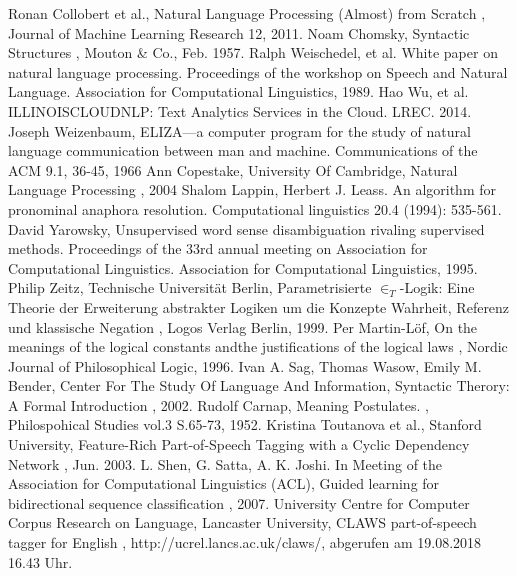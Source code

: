 \documentclass[12pt]{report}
\begin{document}
\newpage
\begin{thebibliography}{20}
Ronan Collobert et al., \glqq  Natural Language Processing (Almost) from Scratch\grqq{} , Journal of Machine Learning Research 12, 2011. 
 Noam Chomsky, \glqq  Syntactic Structures\grqq{} , Mouton \& Co., Feb. 1957.
Ralph Weischedel, et al. \glqq  White paper on natural language processing.\grqq{}  Proceedings of the workshop on Speech and Natural Language. Association for Computational Linguistics, 1989.
Hao Wu, et al. \glqq  ILLINOISCLOUDNLP: Text Analytics Services in the Cloud.\grqq{}  LREC. 2014.
Joseph Weizenbaum, \glqq  ELIZA—a computer program for the study of natural language communication between man and machine.\grqq{}  Communications of the ACM 9.1, 36-45, 1966
Ann Copestake, University Of Cambridge, \glqq  Natural Language Processing\grqq{} , 2004
 Shalom Lappin, Herbert J. Leass. \glqq  An algorithm for pronominal anaphora resolution.\grqq{}  Computational linguistics 20.4 (1994): 535-561.
David Yarowsky, \glqq  Unsupervised word sense disambiguation rivaling supervised methods.\grqq{}  Proceedings of the 33rd annual meeting on Association for Computational Linguistics. Association for Computational Linguistics, 1995.
Philip Zeitz, Technische Universität Berlin, \glqq  Parametrisierte $\in_T$-Logik: Eine Theorie der Erweiterung abstrakter Logiken um die Konzepte Wahrheit, Referenz und klassische Negation\grqq{} , Logos Verlag Berlin, 1999.
Per Martin-Löf, \glqq  On the meanings of the logical constants andthe justifications of the logical laws\grqq{} , Nordic Journal of Philosophical Logic, 1996.
Ivan A. Sag, Thomas Wasow, Emily M. Bender, Center For The Study Of Language And Information, \glqq  Syntactic Therory: A Formal Introduction\grqq{} , 2002.
Rudolf Carnap, \glqq  Meaning Postulates.\grqq{} , Philospohical Studies vol.3 S.65-73, 1952.
Kristina Toutanova et al., Stanford University, \glqq  Feature-Rich Part-of-Speech Tagging with a Cyclic Dependency Network\grqq{} , Jun. 2003.
 L. Shen, G. Satta, A. K. Joshi. In Meeting of the Association for Computational Linguistics (ACL), \glqq  Guided learning for bidirectional sequence classification\grqq{} , 2007.
University Centre for Computer Corpus Research on Language, Lancaster University, \glqq  CLAWS part-of-speech tagger for English\grqq{} , http://ucrel.lancs.ac.uk/claws/, abgerufen am 19.08.2018 16.43 Uhr.

\end{thebibliography}
\end{document}

